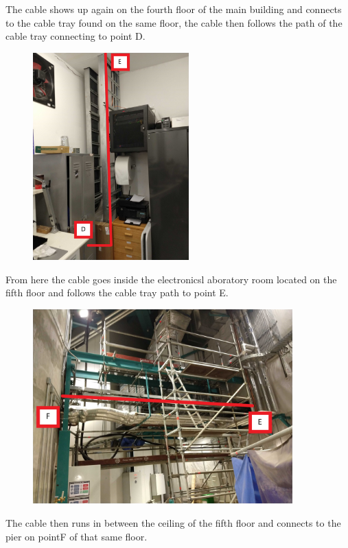   The cable shows up again on the fourth floor of the main building and connects to the cable tray found on the same floor, the cable then follows the path of the cable tray connecting to point D.

  \begin{figure}
    \centering
  \includegraphics[width=6cm]{images/17.jpg}
  \label{fig:jlsimon}
  \end{figure}

  \newpage
  From here the cable goes inside the electronicsl aboratory room located on the fifth floor and follows the cable tray path to point E.

  \begin{figure}
  \centering
  \includegraphics[width=10cm]{images/18.jpg}
  \label{fig:jlsimon}
  \end{figure}

  The cable then runs in between the ceiling of the fifth floor and connects to the pier on pointF of that same floor.

